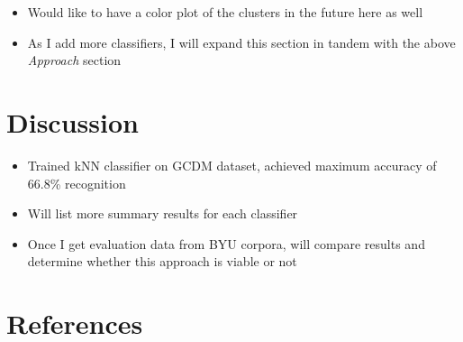 \documentclass[10pt,twocolumn,letterpaper]{article}
\begin{document}
\begin{itemize}
    \item Would like to have a color plot of the clusters in the future here as well
    \item As I add more classifiers, I will expand this section in tandem with the above \textit{Approach} section
\end{itemize}

\section{Discussion}

\begin{itemize}
    \item Trained kNN classifier on GCDM dataset, achieved maximum accuracy of 66.8\% recognition
    \item Will list more summary results for each classifier
    \item Once I get evaluation data from BYU corpora, will compare results and determine whether this approach is viable or not
\end{itemize}

\section{References}

{\small


}
\end{document}

